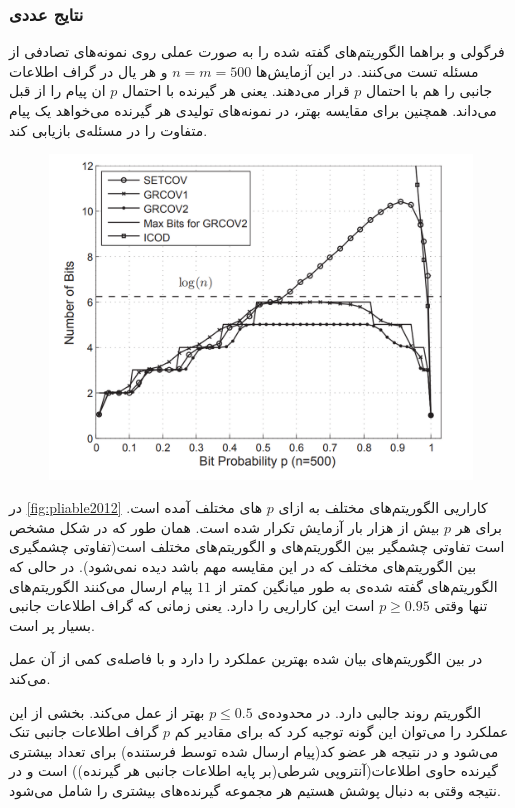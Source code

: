 \subsubsection{
نتایج عددی
}
فرگولی و براهما  الگوریتم‌های گفته شده را به صورت عملی روی نمونه‌های تصادفی از مسئله تست می‌کنند. در این آزمایش‌ها 
$n = m = 500$
و هر یال در گراف اطلاعات جانبی را هم با احتمال
$p$
قرار می‌دهند. یعنی هر گیرنده با احتمال
$p$
ان پیام‌ را از قبل می‌داند. همچنین برای مقایسه بهتر، در نمونه‌های تولیدی هر گیرنده می‌خواهد یک پیام متفاوت را در مسئله‌ی
\icod
بازیابی کند.
\begin{figure}
	\centering
	\includegraphics[width=0.7\linewidth]{figs/ch3/pliable2012}
	\caption{\cite{pliablefirstpaper}}
	\label{fig:pliable2012}
\end{figure}

در 
\autoref{fig:pliable2012}
کاراریی الگوریتم‌های مختلف به ازای 
$p$
های مختلف آمده است. برای هر
$p$
بیش از هزار بار آزمایش تکرار شده است. همان طور که در شکل مشخص است تفاوتی چشمگیر بین الگوریتم‌های
\picod
و الگوریتم‌های مختلف
\icod
است(تفاوتی چشمگیری بین الگوریتم‌های مختلف
\icod
که در این مقایسه مهم باشد دیده نمی‌شود). در حالی که الگوریتم‌های گفته شده‌ی
\picod
به طور میانگین کمتر از
$11$
پیام ارسال می‌کنند الگوریتم‌های
\icod
تنها وقتی
$p \geq 0.95$
است این کاراریی را دارد. یعنی زمانی که گراف اطلاعات جانبی بسیار پر است.

در بین الگوریتم‌های بیان شده
بهترین عملکرد را دارد و
با فاصله‌ی کمی از آن عمل می‌کند.

الگوریتم
روند جالبی دارد. در محدوده‌ی 
$p \leq 0.5$
بهتر از
عمل می‌کند. بخشی از این عملکرد را می‌توان این گونه توجیه کرد که برای مقادیر کم
$p$
گراف اطلاعات جانبی تنک می‌شود و در نتیجه هر عضو کد(پیام ارسال شده توسط فرستنده)  برای تعداد بیشتری گیرنده حاوی اطلاعات(آنتروپی شرطی(بر پایه اطلاعات جانبی هر گیرنده)) است و در نتیجه وقتی به دنبال پوشش هستیم هر مجموعه گیرنده‌های بیشتری را شامل می‌شود.

